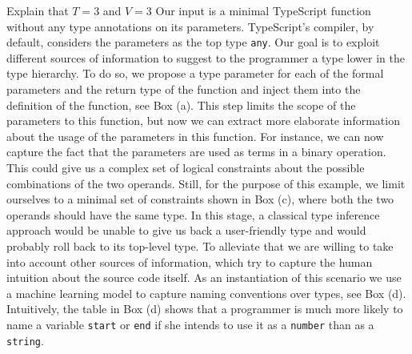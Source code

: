 \documentclass[sigplan,10pt,anonymous]{acmart} %
\newcommand{\margincomment}[2]{\marginpar{\scriptsize\color{Maroon}#1 says: #2}}
\newcommand{\adg}[1]{\margincomment{ADG}{#1}}
\theoremstyle{plain}
\theoremstyle{remark}
\theoremstyle{definition}
\begin{document}
\begin{figure*}
  \centering
  \def\svgwidth{0.75\linewidth}
  

%
%   

\vspace{1em}
\begin{minipage}{\textwidth}
  Explain that $T=3$ and $V=3$
Our input is a minimal TypeScript function without any type annotations on its parameters.
TypeScript's compiler, by default, considers the parameters as the top type \texttt{any}.
Our goal is to exploit different sources of information to suggest to the programmer
a type lower in the type hierarchy.
To do so, we propose a type parameter for each of the formal parameters
and the return type of the function
and inject them into the definition of the function, see Box (a).
This step limits the scope of the parameters to this function, but
now we can extract more elaborate information about the usage of the
parameters in this function.
For instance, we can now capture the
fact that the parameters are used as terms in a binary operation.
This could give us a complex set of logical constraints about the possible combinations of the two operands.
Still, for the purpose of this example, we limit ourselves to a minimal set of constraints shown in Box (c),
where both the two operands should have the same type.
In this stage, a classical type inference approach would be unable to give us back a user-friendly type
and would probably roll back to its top-level type.
To alleviate that we are willing to take into account other sources of information,
which try to capture the human intuition about the source code itself.
As an instantiation of this scenario we use a machine learning model to capture naming conventions over types,
see Box (d).
Intuitively, the table in Box (d) shows that a programmer
is much more likely to name a variable \texttt{start} or \texttt{end}
if she intends to use it as a \texttt{number} than as a \texttt{string}.

\end{minipage}
\end{figure*}
\end{document}
